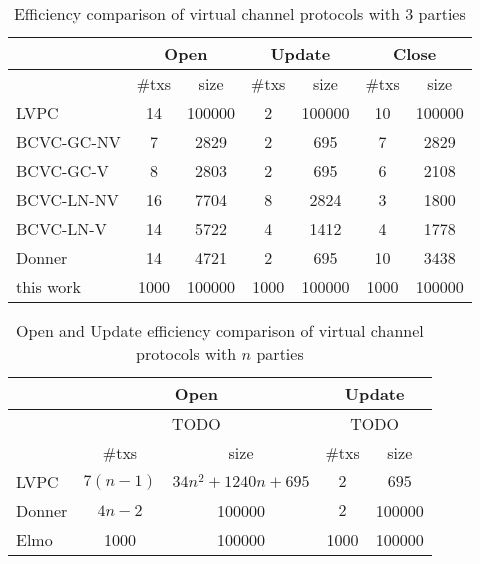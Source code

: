   \begin{table*}
    \caption{Efficiency comparison of virtual channel protocols with $3$
    parties}
    \label{table:comparison:overhead:3-parties}
    \begin{minipage}{\textwidth}
    \begin{center}
    \begin{tabular}{|l|c|c|c|c|c|c|}
    \hline
              & \multicolumn{2}{|c|}{Open} & \multicolumn{2}{|c|}{Update} &
              \multicolumn{2}{|c|}{Close} \\
    \hline
              & \#txs & size & \#txs & size & \#txs & size \\
    \hline
    LVPC       & 14 & 100000 & 2 & 100000 & 10 & 100000 \\
    \hline
    BCVC-GC-NV
              & 7 & 2829 & 2 & 695 & 7 & 2829 \\
    \hline
    BCVC-GC-V & 8 & 2803 & 2 & 695 & 6 & 2108 \\
    \hline
    BCVC-LN-NV
              & 16 & 7704 & 8 & 2824 & 3 & 1800 \\
    \hline
    BCVC-LN-V & 14 & 5722 & 4 & 1412 & 4 & 1778 \\
    \hline
    Donner    & 14 & 4721 & 2 & 695 & 10 & 3438 \\
    \hline
    this work & 1000 & 100000 & 1000 & 100000 & 1000 & 100000 \\
    \hline
    \end{tabular}
    \end{center}
    \end{minipage}
  \end{table*}

  \begin{table*}
    \caption{Open and Update efficiency comparison of virtual channel protocols
    with $n$ parties}
    \label{table:comparison:overhead:n-parties}
    \begin{minipage}{\textwidth}
    \begin{center}
    \begin{tabular}{|l|c|c|c|c|}
    \hline
              & \multicolumn{2}{|c|}{Open} & \multicolumn{2}{|c|}{Update} \\
    \hline
              & \multicolumn{2}{|c|}{TODO} & \multicolumn{2}{|c|}{TODO} \\
    \hline
              & \#txs & size & \#txs & size \\
    \hline
    LVPC      & $7(n-1)$ & $34n^2+1240n+695$ & $2$ & $695$ \\
    \hline
    Donner    & $4n-2$ & 100000 & $2$ & 100000 \\
    \hline
    Elmo      & 1000 & 100000 & 1000 & 100000 \\
    \hline
    \end{tabular}
    \end{center}
    \end{minipage}
  \end{table*}

